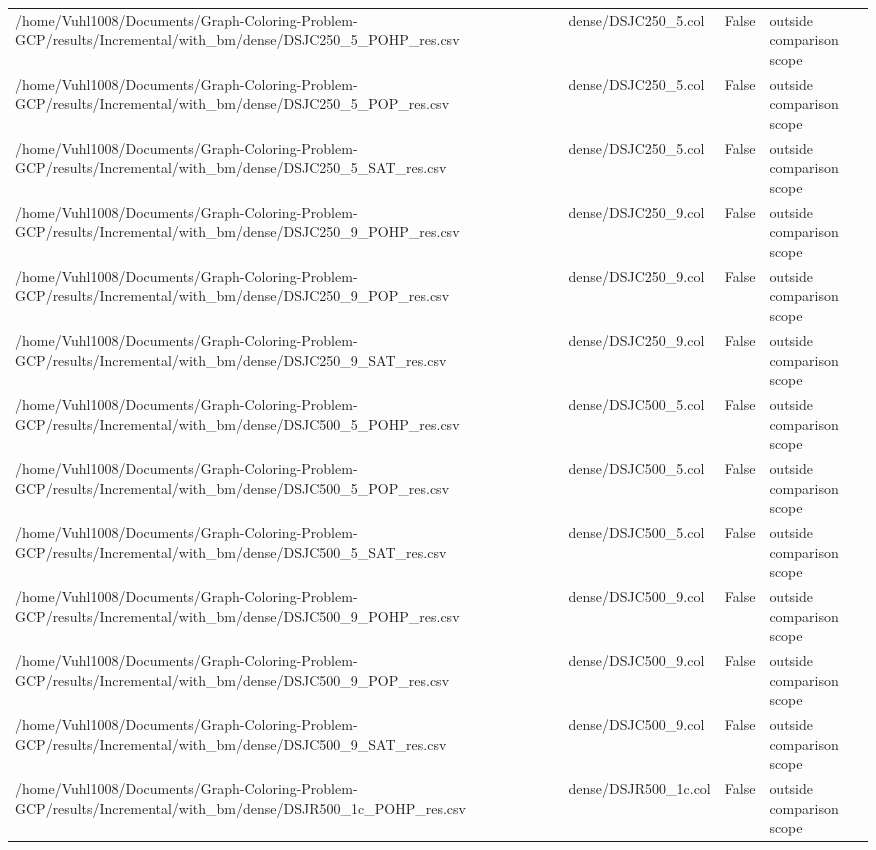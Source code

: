 \begin{table}[htbp]
\begin{tabular}{llll}
/home/Vuhl1008/Documents/Graph-Coloring-Problem-GCP/results/Incremental/with\_bm/dense/DSJC250\_5\_POHP\_res.csv & dense/DSJC250\_5.col & False & outside comparison scope \\
/home/Vuhl1008/Documents/Graph-Coloring-Problem-GCP/results/Incremental/with\_bm/dense/DSJC250\_5\_POP\_res.csv & dense/DSJC250\_5.col & False & outside comparison scope \\
/home/Vuhl1008/Documents/Graph-Coloring-Problem-GCP/results/Incremental/with\_bm/dense/DSJC250\_5\_SAT\_res.csv & dense/DSJC250\_5.col & False & outside comparison scope \\
/home/Vuhl1008/Documents/Graph-Coloring-Problem-GCP/results/Incremental/with\_bm/dense/DSJC250\_9\_POHP\_res.csv & dense/DSJC250\_9.col & False & outside comparison scope \\
/home/Vuhl1008/Documents/Graph-Coloring-Problem-GCP/results/Incremental/with\_bm/dense/DSJC250\_9\_POP\_res.csv & dense/DSJC250\_9.col & False & outside comparison scope \\
/home/Vuhl1008/Documents/Graph-Coloring-Problem-GCP/results/Incremental/with\_bm/dense/DSJC250\_9\_SAT\_res.csv & dense/DSJC250\_9.col & False & outside comparison scope \\
/home/Vuhl1008/Documents/Graph-Coloring-Problem-GCP/results/Incremental/with\_bm/dense/DSJC500\_5\_POHP\_res.csv & dense/DSJC500\_5.col & False & outside comparison scope \\
/home/Vuhl1008/Documents/Graph-Coloring-Problem-GCP/results/Incremental/with\_bm/dense/DSJC500\_5\_POP\_res.csv & dense/DSJC500\_5.col & False & outside comparison scope \\
/home/Vuhl1008/Documents/Graph-Coloring-Problem-GCP/results/Incremental/with\_bm/dense/DSJC500\_5\_SAT\_res.csv & dense/DSJC500\_5.col & False & outside comparison scope \\
/home/Vuhl1008/Documents/Graph-Coloring-Problem-GCP/results/Incremental/with\_bm/dense/DSJC500\_9\_POHP\_res.csv & dense/DSJC500\_9.col & False & outside comparison scope \\
/home/Vuhl1008/Documents/Graph-Coloring-Problem-GCP/results/Incremental/with\_bm/dense/DSJC500\_9\_POP\_res.csv & dense/DSJC500\_9.col & False & outside comparison scope \\
/home/Vuhl1008/Documents/Graph-Coloring-Problem-GCP/results/Incremental/with\_bm/dense/DSJC500\_9\_SAT\_res.csv & dense/DSJC500\_9.col & False & outside comparison scope \\
/home/Vuhl1008/Documents/Graph-Coloring-Problem-GCP/results/Incremental/with\_bm/dense/DSJR500\_1c\_POHP\_res.csv & dense/DSJR500\_1c.col & False & outside comparison scope \\

\end{tabular}
\end{table}
